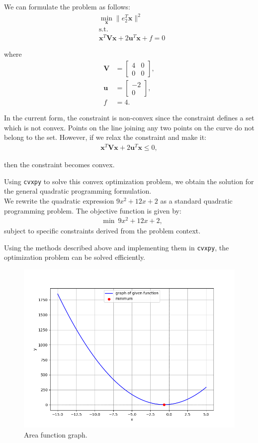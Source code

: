 \documentclass[article]{IEEEtran}
\numberwithin{figure}{enumi}
\begin{document}
We can formulate the problem as follows:
\begin{align}
    &\min_{\mathbf{x}} \|e_2^T \mathbf{x}\|^2 \\
    &\text{s.t.} \\
    &\mathbf{x}^T \mathbf{V} \mathbf{x} + 2 \mathbf{u}^T \mathbf{x} + f = 0
\end{align}

where
\begin{align}
    \mathbf{V} &= \begin{bmatrix} 4 & 0 \\
    0 & 0 \end{bmatrix}, \\
    \mathbf{u} &= \begin{bmatrix} -2 \\
    0 \end{bmatrix}, \\
    f &= 4.
\end{align}

In the current form, the constraint is non-convex since the constraint defines a set which is not convex. Points on the line joining any two points on the curve do not belong to the set. However, if we relax the constraint and make it:
\begin{align}
    \mathbf{x}^T \mathbf{V} \mathbf{x} + 2 \mathbf{u}^T \mathbf{x} \leq 0,
\end{align}

then the constraint becomes convex.

Using \texttt{cvxpy} to solve this convex optimization problem, we obtain the solution for the general quadratic programming formulation. \\
We rewrite the quadratic expression $9x^2 + 12x + 2$ as a standard quadratic programming problem. The objective function is given by:
\begin{align}
    &\min \ 9x^2 + 12x + 2,
\end{align}
subject to specific constraints derived from the problem context.

Using the methods described above and implementing them in \texttt{cvxpy}, the optimization problem can be solved efficiently.
\begin{figure}[h!]
	\centering
	\includegraphics[width=\columnwidth]{figures/Figure_1.png}
	\caption{Area function graph.}
	\label{stemplot}
\end{figure}
\end{document}
